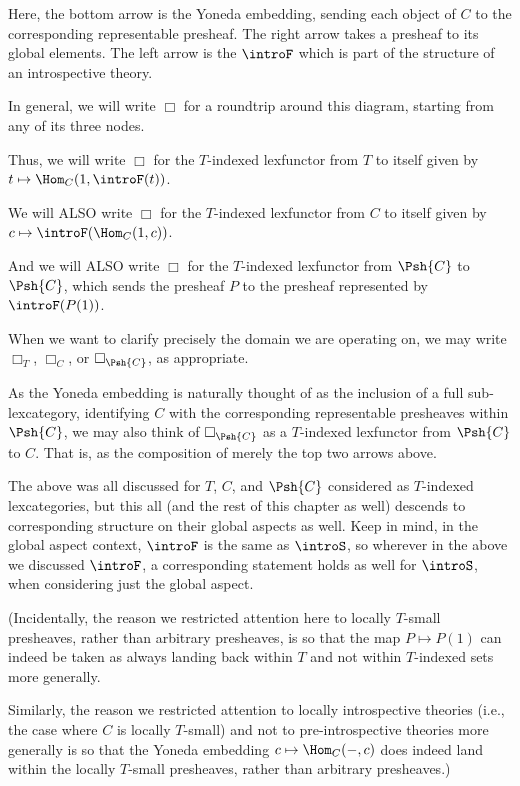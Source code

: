Here, the bottom arrow is the Yoneda embedding, sending each object of $C$ to the corresponding representable presheaf. The right arrow takes a presheaf to its global elements. The left arrow is the $\introF$ which is part of the structure of an introspective theory.

In general, we will write $\Box$ for a roundtrip around this diagram, starting from any of its three nodes.

Thus, we will write $\Box$ for the $T$-indexed lexfunctor from $T$ to itself given by $t \mapsto \Hom_C(1, \introF(t))$.

We will ALSO write $\Box$ for the $T$-indexed lexfunctor from $C$ to itself given by $c \mapsto \introF(\Hom_C(1, c))$.

And we will ALSO write $\Box$ for the $T$-indexed lexfunctor from $\Psh{C}$ to $\Psh{C}$, which sends the presheaf $P$ to the presheaf represented by $\introF(P(1))$.

When we want to clarify precisely the domain we are operating on, we may write $\Box_T$, $\Box_C$, or $\Box_{\Psh{C}}$, as appropriate.

As the Yoneda embedding is naturally thought of as the inclusion of a full sub-lexcategory, identifying $C$ with the corresponding representable presheaves within $\Psh{C}$, we may also think of $\Box_{\Psh{C}}$ as a $T$-indexed lexfunctor from $\Psh{C}$ to $C$. That is, as the composition of merely the top two arrows above.

The above was all discussed for $T$, $C$, and $\Psh{C}$ considered as $T$-indexed lexcategories, but this all (and the rest of this chapter as well) descends to corresponding structure on their global aspects as well. Keep in mind, in the global aspect context, $\introF$ is the same as $\introS$, so wherever in the above we discussed $\introF$, a corresponding statement holds as well for $\introS$, when considering just the global aspect.

\bigskip
(Incidentally, the reason we restricted attention here to locally $T$-small presheaves, rather than arbitrary presheaves, is so that the map $P \mapsto P(1)$ can indeed be taken as always landing back within $T$ and not within $T$-indexed sets more generally.

Similarly, the reason we restricted attention to locally introspective theories (i.e., the case where $C$ is locally $T$-small) and not to pre-introspective theories more generally is so that the Yoneda embedding $c \mapsto \Hom_C(-, c)$ does indeed land within the locally $T$-small presheaves, rather than arbitrary presheaves.)

